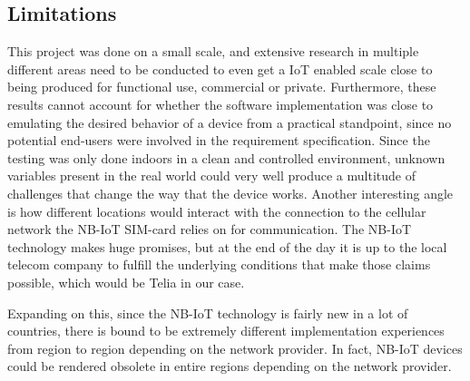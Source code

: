 \subsection{Limitations}
This project was done on a small scale, and extensive research in multiple different areas need to be conducted to even get a IoT enabled scale close to being produced for functional use, commercial or private.
Furthermore, these results cannot account for whether the software implementation was close to emulating the desired behavior of a device from a practical standpoint, since no potential end-users were involved in the requirement specification.
Since the testing was only done indoors in a clean and controlled environment, unknown variables present in the real world could very well produce a multitude of challenges that change the way that the device works. Another interesting angle is how different locations would interact with the connection to the cellular network the NB-IoT SIM-card relies on for communication. The NB-IoT technology makes huge promises, but at the end of the day it is up to the local telecom company to fulfill the underlying conditions that make those claims possible, which would be Telia in our case.

Expanding on this, since the NB-IoT technology is fairly new in a lot of countries, there is bound to be extremely different implementation experiences from region to region depending on the network provider. In fact, NB-IoT devices could be rendered obsolete in entire regions depending on the network provider.
